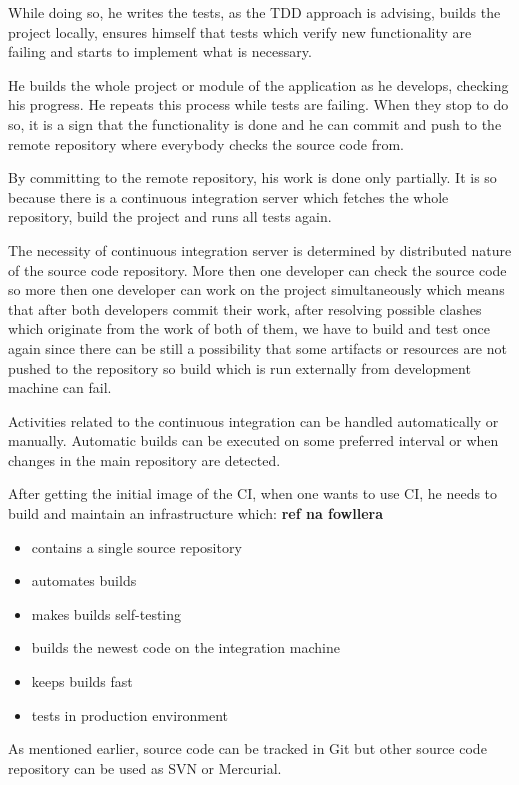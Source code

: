 \documentclass[12pt,final,oneside]{fithesis}
\begin{document}
While doing so, he writes the tests, as the TDD approach is advising, builds the project locally, ensures himself that tests which verify new functionality are failing and starts to implement what is necessary.

He builds the whole project or module of the application as he develops, checking his progress. He repeats this process while tests are failing. When they stop to do so, it is a sign that the functionality is done and he can commit and push to the remote repository where everybody checks the source code from.

By committing to the remote repository, his work is done only partially. It is so because there is a continuous integration server which fetches the whole repository, build the project and runs all tests again.

The necessity of continuous integration server is determined by distributed nature of the source code repository. More then one developer can check the source code so more then one developer can work on the project simultaneously which means that after both developers commit their work, after resolving possible clashes which originate from the work of both of them, we have to build and test once again since there can be still a possibility that some artifacts or resources are not pushed to the repository so build which is run externally from development machine can fail.

Activities related to the continuous integration can be handled automatically or manually. Automatic builds can be executed on some preferred interval or when changes in the main repository are detected.

After getting the initial image of the CI, when one wants to use CI, he needs to build and maintain an infrastructure which: \textbf{ref na fowllera}

\begin{itemize}
	\item{contains a single source repository}
	\item{automates builds}
	\item{makes builds self-testing}
	\item{builds the newest code on the integration machine}
	\item{keeps builds fast}
	\item{tests in production environment}
\end{itemize}

As mentioned earlier, source code can be tracked in Git but other source code repository can be used as SVN or Mercurial.
\end{document}
